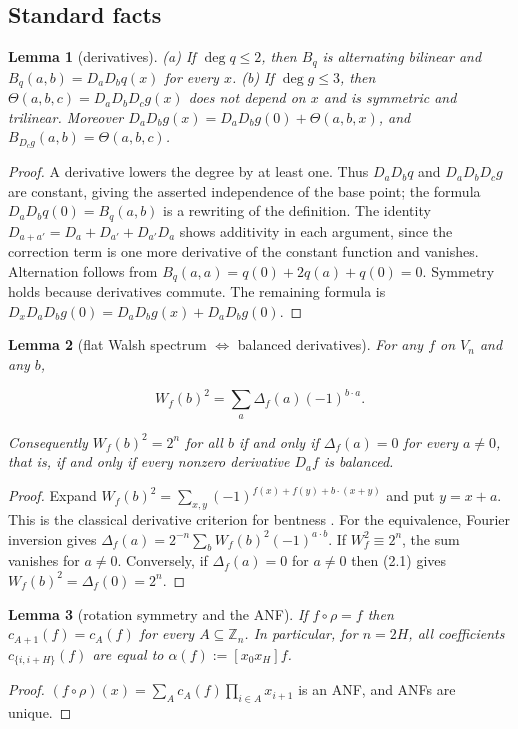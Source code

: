 \documentclass[11pt,reqno]{amsart}
\newtheorem{lemma}{Lemma}[section]
\begin{document}
\subsection{Standard facts}

\begin{lemma}[derivatives]

(a) If $\deg q\le 2$, then $B_q$ is alternating bilinear and $B_q(a,b)=D_aD_bq(x)$ for every $x$.
(b) If $\deg g\le3$, then $\Theta(a,b,c)=D_aD_bD_cg(x)$ does not depend on $x$ and is symmetric and trilinear. Moreover $D_aD_bg(x)=D_aD_bg(0)+\Theta(a,b,x)$, and $B_{D_cg}(a,b)=\Theta(a,b,c)$.

\end{lemma}
\begin{proof}
A derivative lowers the degree by at least one. Thus $D_aD_bq$ and $D_aD_bD_cg$ are constant, giving the asserted independence of the base point; the formula $D_aD_bq(0)=B_q(a,b)$ is a rewriting of the definition. The identity $D_{a+a'}=D_a+D_{a'}+D_{a'}D_a$ shows additivity in each argument, since the correction term is one more derivative of the constant function and vanishes. Alternation follows from $B_q(a,a)=q(0)+2q(a)+q(0)=0$. Symmetry holds because derivatives commute. The remaining formula is $D_xD_aD_bg(0)=D_aD_bg(x)+D_aD_bg(0)$.
\end{proof}

\begin{lemma}[flat Walsh spectrum $\Leftrightarrow$ balanced derivatives]
For any $f$ on $V_n$ and any $b$,

\begin{equation*}W_f(b)^2=\sum_{a}\Delta_f(a)(-1)^{b\cdot a}. \tag{2.1}\end{equation*}

Consequently $W_f(b)^2=2^n$ for all $b$ if and only if $\Delta_f(a)=0$ for every $a\ne0$, that is, if and only if every nonzero derivative $D_af$ is balanced.

\end{lemma}
\begin{proof}
Expand $W_f(b)^2=\sum_{x,y}(-1)^{f(x)+f(y)+b\cdot(x+y)}$ and put $y=x+a$. This is the classical derivative criterion for bentness \cite{ref6}. For the equivalence, Fourier inversion gives $\Delta_f(a)=2^{-n}\sum_bW_f(b)^2(-1)^{a\cdot b}$. If $W_f^2\equiv2^n$, the sum vanishes for $a\neq0$. Conversely, if $\Delta_f(a)=0$ for $a\ne0$ then (2.1) gives $W_f(b)^2=\Delta_f(0)=2^n$.
\end{proof}

\begin{lemma}[rotation symmetry and the ANF]
If $f\circ\rho=f$ then $c_{A+1}(f)=c_A(f)$ for every $A\subseteq\mathbb Z_n$. In particular, for $n=2H$, all coefficients $c_{\{i,i+H\}}(f)$ are equal to $\alpha(f):=[x_0x_H]f$.

\end{lemma}
\begin{proof}
$(f\circ\rho)(x)=\sum_Ac_A(f)\prod_{i\in A}x_{i+1}$ is an ANF, and ANFs are unique.
\end{proof}
\end{document}
